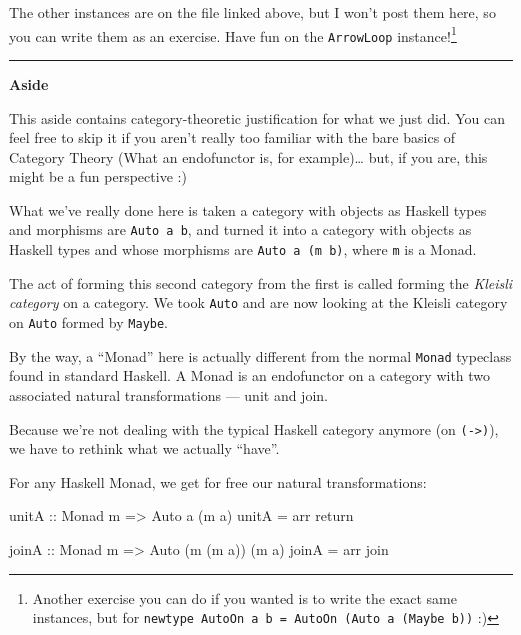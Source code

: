 \documentclass[]{article}
\newenvironment{Shaded}{}{}
\newcommand{\DataTypeTok}[1]{\textcolor[rgb]{0.56,0.13,0.00}{#1}}
\newcommand{\FunctionTok}[1]{\textcolor[rgb]{0.02,0.16,0.49}{#1}}
\newcommand{\NormalTok}[1]{#1}
\newcommand{\OtherTok}[1]{\textcolor[rgb]{0.00,0.44,0.13}{#1}}
\begin{document}
The other instances are on the file linked above, but I won't post them here, so
you can write them as an exercise. Have fun on the \texttt{ArrowLoop}
instance!\footnote{Another exercise you can do if you wanted is to write the
  exact same instances, but for
  \texttt{newtype\ AutoOn\ a\ b\ =\ AutoOn\ (Auto\ a\ (Maybe\ b))} :)}

\begin{center}\rule{0.5\linewidth}{\linethickness}\end{center}

\textbf{Aside}

This aside contains category-theoretic justification for what we just did. You
can feel free to skip it if you aren't really too familiar with the bare basics
of Category Theory (What an endofunctor is, for example)\ldots{} but, if you
are, this might be a fun perspective :)

What we've really done here is taken a category with objects as Haskell types
and morphisms are \texttt{Auto\ a\ b}, and turned it into a category with
objects as Haskell types and whose morphisms are \texttt{Auto\ a\ (m\ b)}, where
\texttt{m} is a Monad.

The act of forming this second category from the first is called forming the
\emph{Kleisli category} on a category. We took \texttt{Auto} and are now looking
at the Kleisli category on \texttt{Auto} formed by \texttt{Maybe}.

By the way, a ``Monad'' here is actually different from the normal
\texttt{Monad} typeclass found in standard Haskell. A Monad is an endofunctor on
a category with two associated natural transformations --- unit and join.

Because we're not dealing with the typical Haskell category anymore (on
\texttt{(-\textgreater{})}), we have to rethink what we actually ``have''.

For any Haskell Monad, we get for free our natural transformations:

\begin{Shaded}
\begin{Highlighting}[]
\OtherTok{unitA ::} \DataTypeTok{Monad}\NormalTok{ m }\OtherTok{=>} \DataTypeTok{Auto}\NormalTok{ a (m a)}
\NormalTok{unitA }\OtherTok{=}\NormalTok{ arr }\FunctionTok{return}

\OtherTok{joinA ::} \DataTypeTok{Monad}\NormalTok{ m }\OtherTok{=>} \DataTypeTok{Auto}\NormalTok{ (m (m a)) (m a)}
\NormalTok{joinA }\OtherTok{=}\NormalTok{ arr join}
\end{Highlighting}
\end{Shaded}
\end{document}

